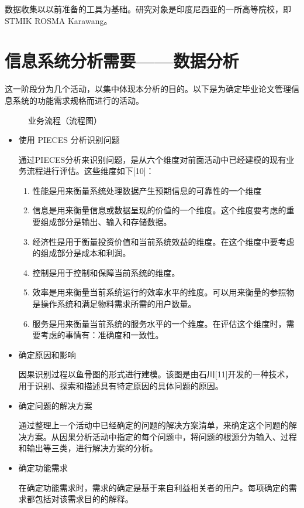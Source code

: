 数据收集以以前准备的工具为基础。研究对象是印度尼西亚的一所高等院校，即STMIK ROSMA Karawang。

\section{信息系统分析需要——数据分析}

这一阶段分为几个活动，以集中体现本分析的目的。以下是为确定毕业论文管理信息系统的功能需求规格而进行的活动。

\begin{figure}[htbp]
    \centering
    \label{业务流程图}
    \caption{\song\wuhao 业务流程（流程图）}
\end{figure}

\begin{itemize}
    \item 使用 PIECES 分析识别问题

          通过PIECES分析来识别问题，是从六个维度对前面活动中已经建模的现有业务流程进行评估。这些维度如下[10]：
          \begin{enumerate}
              \item 性能是用来衡量系统处理数据产生预期信息的可靠性的一个维度
              \item 信息是用来衡量信息或数据呈现的价值的一个维度。这个维度要考虑的重要组成部分是输出、输入和存储数据。
              \item 经济性是用于衡量投资价值和当前系统效益的维度。在这个维度中要考虑的组成部分是成本和利润。
              \item 控制是用于控制和保障当前系统的维度。
              \item 效率是用来衡量当前系统运行的效率水平的维度。可以用来衡量的参照物是操作系统和满足物料需求所需的用户数量。
              \item 服务是用来衡量当前系统的服务水平的一个维度。在评估这个维度时，需要考虑的事情有：准确度和一致性。
          \end{enumerate}
    \item 确定原因和影响

          因果识别过程以鱼骨图的形式进行建模。该图是由石川[11]开发的一种技术，用于识别、探索和描述具有特定原因的具体问题的原因。

    \item 确定问题的解决方案

          通过整理上一个活动中已经确定的问题的解决方案清单，来确定这个问题的解决方案。从因果分析活动中指定的每个问题中，将问题的根源分为输入、过程和输出等三类，进行解决方案的分析。

    \item 确定功能需求

          在确定功能需求时，需求的确定是基于来自利益相关者的用户。每项确定的需求都包括对该需求目的的解释。

\end{itemize}

